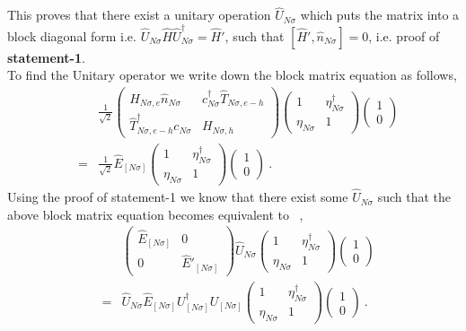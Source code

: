 \documentclass[12pt,a4paper]{article}
\begin{document}
This proves that there exist a unitary operation $\hat{U}_{N\sigma}$ which puts the matrix into a block diagonal form i.e. $\hat{U}_{N\sigma}\hat{H}\hat{U}^{\dagger}_{N\sigma}=\hat{H}'$, such that $[\hat{H}',\hat{n}_{N\sigma}]=0$, i.e. proof of \textbf{statement-1}.\\
To find the Unitary operator we write down the block matrix equation  as follows,
\begin{eqnarray}
&&\frac{1}{\sqrt{2}}
\begin{pmatrix}
			H_{N\sigma,e}\hat{n}_{N\sigma}								 & c^{\dagger}_{N\sigma}\hat{T}_{N\sigma,e-h}\\
				\hat{T}^{\dagger}_{N\sigma,e-h}c_{N\sigma}						& H_{N\sigma,h}
											\end{pmatrix}\begin{pmatrix}
											1 & \eta^{\dagger}_{N\sigma}\\
											\eta_{N\sigma} & 1
											\end{pmatrix}\begin{pmatrix}
											1 \\ 0
											\end{pmatrix}\nonumber\\
											&=&\frac{1}{\sqrt{2}}\hat{E}_{[N\sigma]}\begin{pmatrix}
											1 & \eta^{\dagger}_{N\sigma}\\
											\eta_{N\sigma} & 1
											\end{pmatrix}\begin{pmatrix}
											1 \\ 0
											\end{pmatrix}~.
\end{eqnarray}
Using the proof of statement-1 we know that there exist some $\hat{U}_{N\sigma}$ such that the above block matrix equation becomes equivalent to ~,~
\begin{eqnarray}
&&\begin{pmatrix}
			\hat{E}_{[N\sigma]}							 & 0\\
				0					& \hat{E}'_{[N\sigma]}
											\end{pmatrix}\hat{U}_{N\sigma}\begin{pmatrix}
											1 & \eta^{\dagger}_{N\sigma}\\
											\eta_{N\sigma} & 1
											\end{pmatrix}\begin{pmatrix}
											1 \\ 0
											\end{pmatrix}\nonumber\\
											&=&\hat{U}_{N\sigma}\hat{E}_{[N\sigma]}U^{\dagger}_{[N\sigma]}U_{[N\sigma]}\begin{pmatrix}
											1 & \eta^{\dagger}_{N\sigma}\\
											\eta_{N\sigma} & 1
											\end{pmatrix}\begin{pmatrix}
											1 \\ 0
											\end{pmatrix}~.
\end{eqnarray} 
\end{document}
